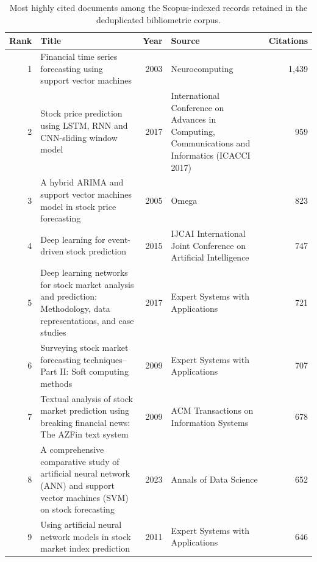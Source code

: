 \documentclass[12pt]{article}
\numberwithin{equation}{section}
\begin{document}
\begin{table}[!t]
\centering
\caption{Most highly cited documents among the Scopus-indexed records
retained in the deduplicated bibliometric corpus.}
\label{tab:supp-cited-documents}

\small
\setlength{\tabcolsep}{3.5pt}
\renewcommand{\arraystretch}{1.15}

\begin{tabular}{@{}rp{6.8cm}rp{4.5cm}r@{}}
\toprule
Rank &
Title &
Year &
Source &
Citations \\
\midrule

1 &
Financial time series forecasting using support vector machines &
2003 &
Neurocomputing &
1,439 \\

2 &
Stock price prediction using LSTM, RNN and CNN-sliding window model &
2017 &
International Conference on Advances in Computing,
Communications and Informatics (ICACCI 2017) &
959 \\

3 &
A hybrid ARIMA and support vector machines model in stock price
forecasting &
2005 &
Omega &
823 \\

4 &
Deep learning for event-driven stock prediction &
2015 &
IJCAI International Joint Conference on Artificial Intelligence &
747 \\

5 &
Deep learning networks for stock market analysis and prediction:
Methodology, data representations, and case studies &
2017 &
Expert Systems with Applications &
721 \\

6 &
Surveying stock market forecasting techniques--Part II:
Soft computing methods &
2009 &
Expert Systems with Applications &
707 \\

7 &
Textual analysis of stock market prediction using breaking
financial news: The AZFin text system &
2009 &
ACM Transactions on Information Systems &
678 \\

8 &
A comprehensive comparative study of artificial neural network
(ANN) and support vector machines (SVM) on stock forecasting &
2023 &
Annals of Data Science &
652 \\

9 &
Using artificial neural network models in stock market index
prediction &
2011 &
Expert Systems with Applications &
646 \\


\end{tabular}
\end{table}
\end{document}
